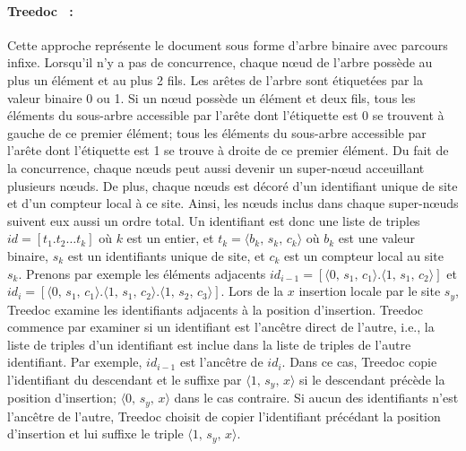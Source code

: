 \paragraph{Treedoc~\cite{letia2009crdts, preguica2009commutative} :} Cette
approche représente le document sous forme d'arbre binaire avec parcours infixe.
Lorsqu'il n'y a pas de concurrence, chaque nœud de l'arbre possède au plus un
élément et au plus 2 fils. Les arêtes de l'arbre sont étiquetées par la valeur
binaire 0 ou 1.  Si un nœud possède un élément et deux fils, tous les éléments
du sous-arbre accessible par l'arête dont l'étiquette est 0 se trouvent à gauche
de ce premier élément; tous les éléments du sous-arbre accessible par l'arête
dont l'étiquette est 1 se trouve à droite de ce premier élément. Du fait de la
concurrence, chaque nœuds peut aussi devenir un super-nœud acceuillant plusieurs
nœuds. De plus, chaque nœuds est décoré d'un identifiant unique de site et d'un
compteur local à ce site. Ainsi, les nœuds inclus dans chaque super-nœuds
suivent eux aussi un ordre total. Un identifiant est donc une liste de triples
$id = [t_1.t_2\ldots t_k]$ où $k$ est un entier, et
$t_k = \langle b_k,\, s_k,\, c_k\rangle$ où $b_k$ est une valeur binaire, $s_k$
est un identifiants unique de site, et $c_k$ est un compteur local au site
$s_k$.  Prenons par exemple les éléments adjacents
$id_{i-1}=[\langle 0,\,s_1,\,c_1 \rangle.\langle 1,\,s_1,\,c_2 \rangle]$ et
$id_i=[\langle 0,\,s_1,\,c_1 \rangle.\langle 1,\,s_1,\,c_2 \rangle. \langle 1,\,
s_2,\, c_3 \rangle]$.
Lors de la $x$ insertion locale par le site $s_y$, Treedoc examine les
identifiants adjacents à la position d'insertion. Treedoc commence par examiner
si un identifiant est l'ancêtre direct de l'autre, i.e., la liste de triples
d'un identifiant est inclue dans la liste de triples de l'autre identifiant. Par
exemple, $id_{i-1}$ est l'ancêtre de $id_i$. Dans ce cas, Treedoc copie
l'identifiant du descendant et le suffixe par $\langle 1,\, s_y,\, x \rangle$ si
le descendant précède la position d'insertion; $\langle 0,\, s_y,\, x \rangle$
dans le cas contraire. Si aucun des identifiants n'est l'ancêtre de l'autre,
Treedoc choisit de copier l'identifiant précédant la position d'insertion et lui
suffixe le triple $\langle 1,\, s_y,\, x \rangle$.


